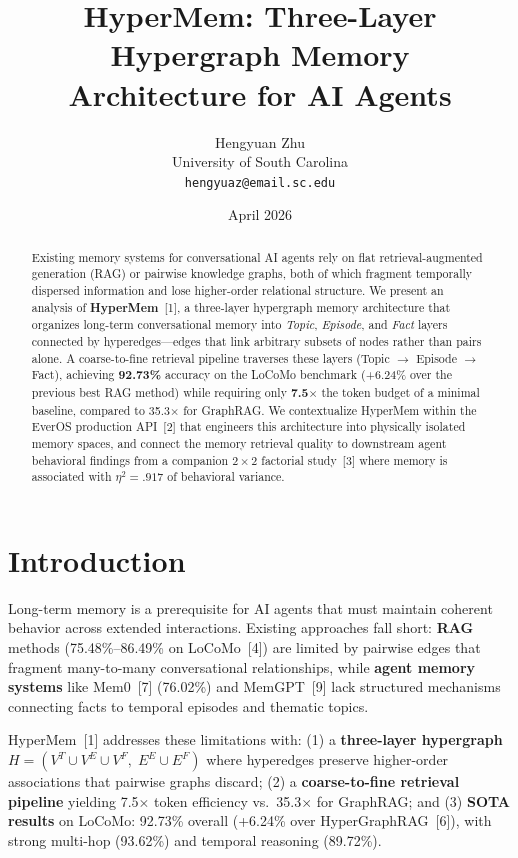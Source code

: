 \documentclass[11pt, a4paper]{article}
\title{%
  \sffamily\bfseries
  HyperMem: Three-Layer Hypergraph Memory\\
  Architecture for AI Agents%
}
\author{%
  Hengyuan Zhu\\
  {\small University of South Carolina}\\
  {\small\texttt{hengyuaz@email.sc.edu}}%
}
\date{April 2026}
\begin{document}
\maketitle

\begin{abstract}
\noindent
Existing memory systems for conversational AI agents rely on flat retrieval-augmented generation (RAG) or pairwise knowledge graphs, both of which fragment temporally dispersed information and lose higher-order relational structure.
We present an analysis of \textbf{HyperMem}~[1], a three-layer hypergraph memory architecture that organizes long-term conversational memory into \emph{Topic}, \emph{Episode}, and \emph{Fact} layers connected by hyperedges---edges that link arbitrary subsets of nodes rather than pairs alone.
A coarse-to-fine retrieval pipeline traverses these layers (Topic $\to$ Episode $\to$ Fact), achieving \textbf{92.73\%} accuracy on the LoCoMo benchmark (+6.24\% over the previous best RAG method) while requiring only \textbf{7.5$\times$} the token budget of a minimal baseline, compared to 35.3$\times$ for GraphRAG.
We contextualize HyperMem within the EverOS production API~[2] that engineers this architecture into physically isolated memory spaces, and connect the memory retrieval quality to downstream agent behavioral findings from a companion $2 \times 2$ factorial study~[3] where memory is associated with $\eta^2 = .917$ of behavioral variance.
\end{abstract}

\section{Introduction}

Long-term memory is a prerequisite for AI agents that must maintain coherent behavior across extended interactions. Existing approaches fall short: \textbf{RAG} methods (75.48\%--86.49\% on LoCoMo~[4]) are limited by pairwise edges that fragment many-to-many conversational relationships, while \textbf{agent memory systems} like Mem0~[7] (76.02\%) and MemGPT~[9] lack structured mechanisms connecting facts to temporal episodes and thematic topics.

HyperMem~[1] addresses these limitations with: (1) a \textbf{three-layer hypergraph} $H = (V^T \cup V^E \cup V^F,\; E^E \cup E^F)$ where hyperedges preserve higher-order associations that pairwise graphs discard; (2) a \textbf{coarse-to-fine retrieval pipeline} yielding 7.5$\times$ token efficiency vs.\ 35.3$\times$ for GraphRAG; and (3) \textbf{SOTA results} on LoCoMo: 92.73\% overall (+6.24\% over HyperGraphRAG~[6]), with strong multi-hop (93.62\%) and temporal reasoning (89.72\%).
\end{document}
